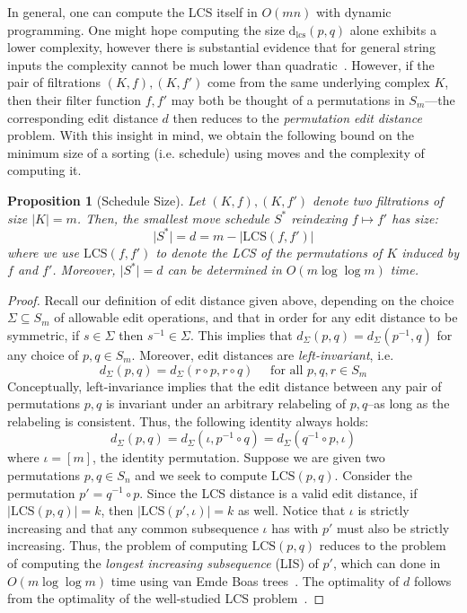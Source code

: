 \documentclass[sn-mathphys]{sn-jnl}
\newtheorem{proposition}{Proposition}
\begin{document}
%
In general, one can compute the LCS itself in $O(mn)$  with dynamic programming. One might hope computing the size $\mathrm{d}_{\mathrm{lcs}}(p,q)$ alone exhibits a lower complexity, however there is substantial evidence that for general string inputs the complexity cannot be much lower than quadratic~\cite{abboud2015tight}. 
However, if the pair of filtrations $(K, f), (K, f')$ come from the same underlying complex $K$, then their filter function $f, f'$ may both be thought of a permutations in $S_m$---the corresponding edit distance $d$ then reduces to the \emph{permutation edit distance} problem.
With this insight in mind, we obtain the following bound on the minimum size of a sorting (i.e. schedule) using moves and the complexity of computing it. 
\begin{proposition}[Schedule Size]\label{prop:schedule_size}
Let $(K, f), (K, f')$ denote two filtrations of size $\lvert K \rvert = m$. Then, the smallest move schedule $S^*$ reindexing $f \mapsto f'$ has size: 
$$ \lvert S^\ast \rvert = d = m - \lvert \mathrm{LCS}(f, f') \rvert $$ 
where we use $\mathrm{LCS}(f, f')$ to denote the LCS of the permutations of $K$ induced by $f$ and $f'$.
Moreover, $\lvert S^\ast \rvert = d$ can be determined in $O(m \log \log m)$ time. 
\end{proposition}
\begin{proof} \normalsize
Recall our definition of  edit distance given above, 
depending on the choice   $\Sigma \subseteq S_m$ of allowable edit operations, and that in order for any edit distance to be symmetric, if $s \in \Sigma$ then $s^{-1} \in \Sigma$. This implies that $d_\Sigma(p,q) = d_\Sigma(p^{-1}, q)$ for any choice of  $p,q \in S_m$. 
Moreover, edit distances are \emph{left-invariant}, i.e.
\[
d_\Sigma(p,q) = d_\Sigma(r \circ p, r \circ q) \quad \text{ for all } p,q,r \in S_m
\]
Conceptually, left-invariance implies that the edit distance between any pair of permutations $p,q$ is invariant under an arbitrary relabeling of $p,q$--as long as the relabeling is consistent. Thus, the following identity always holds: 
$$ d_\Sigma(p,q) = d_\Sigma(\iota, p^{-1} \circ q) = d_\Sigma(q^{-1} \circ p, \iota) $$
where $\iota = [m]$, the identity permutation. Suppose we are given two permutations $p, q \in S_n$ and we seek to compute $\mathrm{LCS}(p, q)$. Consider the permutation $p' = q^{-1} \circ p$. Since the LCS distance is a valid edit distance, if $\lvert \mathrm{LCS}(p, q) \rvert = k$, then $\lvert \mathrm{LCS}(p', \iota) \rvert = k$ as well. Notice that $\iota$ is strictly increasing and that any common subsequence $\iota$ has with $p'$ must also be strictly increasing. Thus, the problem of computing $\mathrm{LCS}(p, q)$ reduces to the problem of computing the \emph{longest increasing subsequence} (LIS) of $p'$, which can done in $O( m \log \log m)$ time using van Emde Boas trees~\cite{bespamyatnikh2000enumerating}. The optimality of $d$ follows from the optimality of the well-studied LCS problem~\cite{kumar1987linear}. 
\end{proof}
\end{document}
